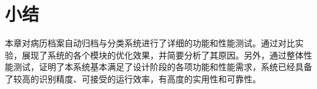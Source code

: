 \section{小结}
本章对病历档案自动归档与分类系统进行了详细的功能和性能测试。通过对比实验，展现了系统的各个模块的优化效果，并简要分析了其原因。另外，通过整体性能测试，证明了本系统基本满足了设计阶段的各项功能和性能需求，系统已经具备了较高的识别精度、可接受的运行效率，有高度的实用性和可靠性。

